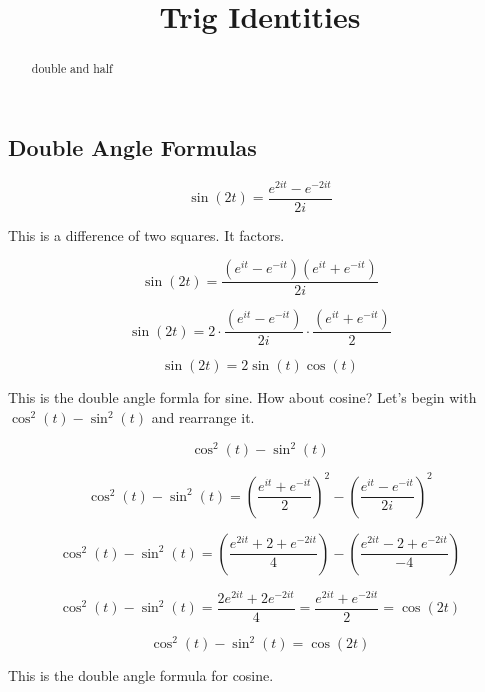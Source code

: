 \documentclass{ximera}
\title{Trig Identities}
\begin{document}
\begin{abstract}
double and half
\end{abstract}
\maketitle






\subsection*{Double Angle Formulas}


\[   \sin(2t) = \frac{e^{2it} - e^{-2it}}{2 i}      \]


This is a difference of two squares.  It factors.



\[   \sin(2t) = \frac{(e^{i t} - e^{-i t})(e^{i t} + e^{-i t})}{2 i}      \]




\[   \sin(2t) = 2 \cdot \frac{(e^{i t} - e^{-i t})}{2i}    \cdot    \frac{(e^{i t} + e^{-i t})}{2}      \]



\[   \sin(2t) = 2 \sin(t)   \cos(t)      \]

This is the double angle formla for sine.  How about cosine?
Let's begin with $\cos^2(t) - \sin^2(t)$ and rearrange it.











\[      \cos^2(t) - \sin^2(t)      \]



\[      \cos^2(t) - \sin^2(t)   = \left( \frac{e^{i t} + e^{-i t}}{2} \right)^2 - \left( \frac{e^{i t} - e^{-i t}}{2i} \right)^2  \]


\[      \cos^2(t) - \sin^2(t)   = \left( \frac{e^{2i t} + 2 + e^{-2i t}}{4} \right) - \left( \frac{e^{2 i t} - 2 + e^{-2i t}}{-4} \right)  \]



\[      \cos^2(t) - \sin^2(t)   = \frac{2 e^{2i t}  + 2 e^{-2i t}}{4}   = \frac{e^{2i t}  + e^{-2i t}}{2} = \cos(2t)   \]




\[      \cos^2(t) - \sin^2(t)  = \cos(2t)    \]


This is the double angle formula for cosine. \\
\end{document}
